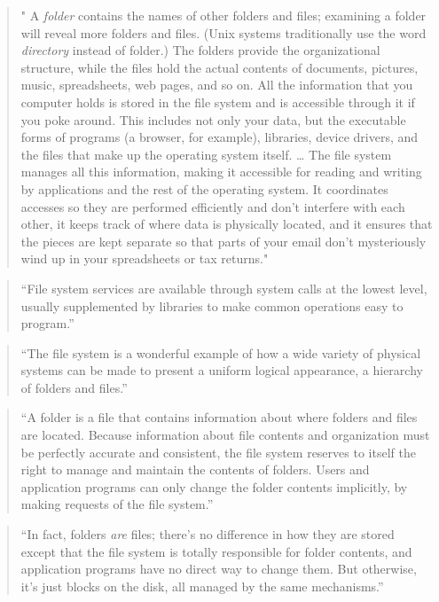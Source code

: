 \documentclass[]{tufte-book}
\begin{document}
\begin{quote}
" A \emph{folder} contains the names of other folders and files; examining a folder will
reveal more folders and files. (Unix systems traditionally use the word \emph{directory}
instead of folder.) The folders provide the organizational structure, while the files
hold the actual contents of documents, pictures, music, spreadsheets, web pages, and
so on. All the information that you computer holds is stored in the file system and
is accessible through it if you poke around. This includes not only your data, but the
executable forms of programs (a browser, for example), libraries, device drivers, and the
files that make up the operating system itself. \ldots{} The file system manages all this
information, making it accessible for reading and writing by applications and the rest of
the operating system. It coordinates accesses so they are performed efficiently and
don't interfere with each other, it keeps track of where data is physically located,
and it ensures that the pieces are kept separate so that parts of your email don't
mysteriously wind up in your spreadsheets or tax returns." \citep{kernighan2011d}
\end{quote}

\begin{quote}
``File system services are available through system calls at the lowest level,
usually supplemented by libraries to make common operations easy to program.''
\citep{kernighan2011d}
\end{quote}

\begin{quote}
``The file system is a wonderful example of how a wide variety of physical
systems can be made to present a uniform logical appearance, a hierarchy of folders
and files.'' \citep{kernighan2011d}
\end{quote}

\begin{quote}
``A folder is a file that contains information about where folders and files are
located. Because information about file contents and organization must be perfectly
accurate and consistent, the file system reserves to itself the right to manage and
maintain the contents of folders. Users and application programs can only change the
folder contents implicitly, by making requests of the file system.'' \citep{kernighan2011d}
\end{quote}

\begin{quote}
``In fact, folders \emph{are} files; there's no difference in how they are stored except
that the file system is totally responsible for folder contents, and application
programs have no direct way to change them. But otherwise, it's just blocks on the disk,
all managed by the same mechanisms.'' \citep{kernighan2011d}
\end{quote}
\end{document}
